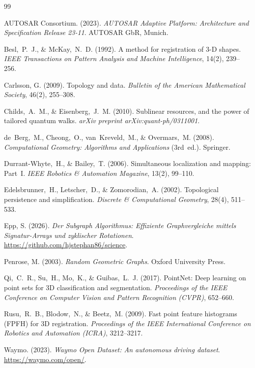 ﻿\documentclass[a4paper,12pt]{article}
\theoremstyle{definition}
\begin{document}
\begin{thebibliography}{99}

AUTOSAR Consortium. (2023).
\emph{AUTOSAR Adaptive Platform: Architecture and Specification
Release 23-11}.
AUTOSAR GbR, Munich.

Besl,~P.~J., \& McKay,~N.~D. (1992).
A method for registration of 3-D shapes.
\emph{IEEE Transactions on Pattern Analysis and Machine Intelligence},
14(2), 239--256.

Carlsson, G. (2009).
Topology and data.
\emph{Bulletin of the American Mathematical Society}, 46(2), 255--308.

Childs,~A.~M., \& Eisenberg,~J.~M. (2010).
Sublinear resources, and the power of tailored quantum walks.
\emph{arXiv preprint arXiv:quant-ph/0311001}.

de~Berg,~M., Cheong,~O., van~Kreveld,~M., \& Overmars,~M. (2008).
\emph{Computational Geometry: Algorithms and Applications} (3rd~ed.).
Springer.

Durrant-Whyte,~H., \& Bailey,~T. (2006).
Simultaneous localization and mapping: Part~I.
\emph{IEEE Robotics \& Automation Magazine}, 13(2), 99--110.

Edelsbrunner,~H., Letscher,~D., \& Zomorodian,~A. (2002).
Topological persistence and simplification.
\emph{Discrete \& Computational Geometry}, 28(4), 511--533.

Epp, S. (2026).
\emph{Der Subgraph Algorithmus: Effiziente Graphvergleiche mittels
Signatur-Arrays und zyklischer Rotationen}.
\url{https://github.com/hjstephan86/science}.

Penrose, M. (2003).
\emph{Random Geometric Graphs}.
Oxford University Press.

Qi,~C.~R., Su,~H., Mo,~K., \& Guibas,~L.~J. (2017).
PointNet: Deep learning on point sets for 3D classification and
segmentation.
\emph{Proceedings of the IEEE Conference on Computer Vision and
Pattern Recognition (CVPR)}, 652--660.

Rusu,~R.~B., Blodow,~N., \& Beetz,~M. (2009).
Fast point feature histograms (FPFH) for 3D registration.
\emph{Proceedings of the IEEE International Conference on Robotics and
Automation (ICRA)}, 3212--3217.

Waymo. (2023).
\emph{Waymo Open Dataset: An autonomous driving dataset}.
\url{https://waymo.com/open/}.

\end{thebibliography}
\end{document}
